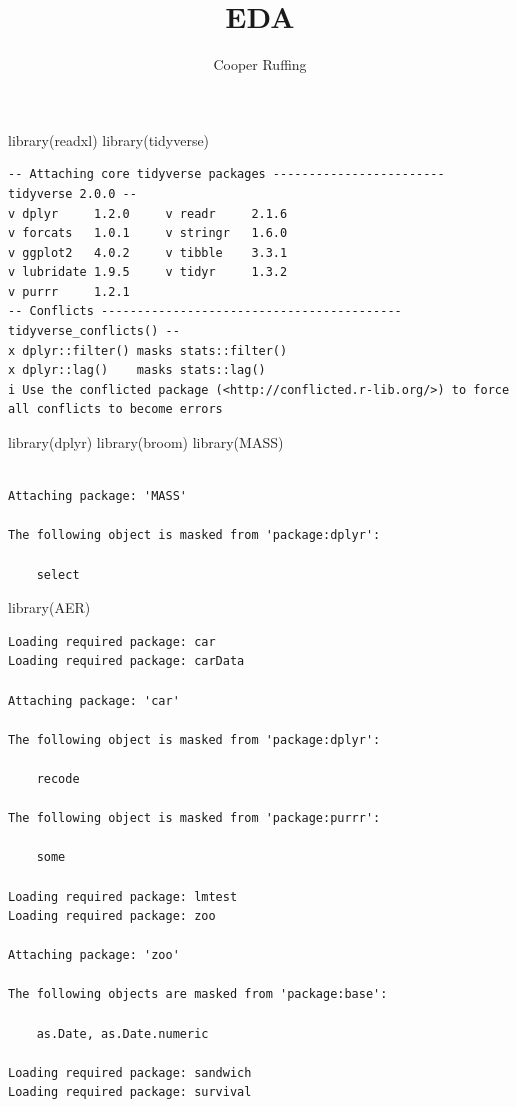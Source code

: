 \documentclass[
  letterpaper,
  DIV=11,
  numbers=noendperiod]{scrartcl}
\title{EDA}
\author{Cooper Ruffing}
\date{}
\newenvironment{Shaded}{\begin{snugshade}}{\end{snugshade}}
\newcommand{\FunctionTok}[1]{\textcolor[rgb]{0.28,0.35,0.67}{#1}}
\newcommand{\NormalTok}[1]{\textcolor[rgb]{0.00,0.23,0.31}{#1}}
\begin{document}
\maketitle


\begin{Shaded}
\begin{Highlighting}[]
\FunctionTok{library}\NormalTok{(readxl)}
\FunctionTok{library}\NormalTok{(tidyverse)}
\end{Highlighting}
\end{Shaded}

\begin{verbatim}
-- Attaching core tidyverse packages ------------------------ tidyverse 2.0.0 --
v dplyr     1.2.0     v readr     2.1.6
v forcats   1.0.1     v stringr   1.6.0
v ggplot2   4.0.2     v tibble    3.3.1
v lubridate 1.9.5     v tidyr     1.3.2
v purrr     1.2.1     
-- Conflicts ------------------------------------------ tidyverse_conflicts() --
x dplyr::filter() masks stats::filter()
x dplyr::lag()    masks stats::lag()
i Use the conflicted package (<http://conflicted.r-lib.org/>) to force all conflicts to become errors
\end{verbatim}

\begin{Shaded}
\begin{Highlighting}[]
\FunctionTok{library}\NormalTok{(dplyr)}
\FunctionTok{library}\NormalTok{(broom)}
\FunctionTok{library}\NormalTok{(MASS)}
\end{Highlighting}
\end{Shaded}

\begin{verbatim}

Attaching package: 'MASS'

The following object is masked from 'package:dplyr':

    select
\end{verbatim}

\begin{Shaded}
\begin{Highlighting}[]
\FunctionTok{library}\NormalTok{(AER)}
\end{Highlighting}
\end{Shaded}

\begin{verbatim}
Loading required package: car
Loading required package: carData

Attaching package: 'car'

The following object is masked from 'package:dplyr':

    recode

The following object is masked from 'package:purrr':

    some

Loading required package: lmtest
Loading required package: zoo

Attaching package: 'zoo'

The following objects are masked from 'package:base':

    as.Date, as.Date.numeric

Loading required package: sandwich
Loading required package: survival
\end{verbatim}
\end{document}
